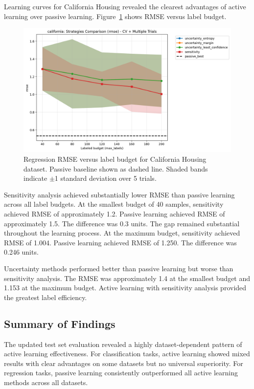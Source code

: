 \documentclass[conference]{IEEEtran}
\begin{document}
Learning curves for California Housing revealed the clearest advantages of active learning over passive learning. Figure~\ref{fig:california-compare} shows RMSE versus label budget.

\begin{figure}[t]
\centering
\includegraphics[width=0.95\columnwidth]{figures/reg_california_comparison_rmse.png}
\caption{Regression RMSE versus label budget for California Housing dataset. Passive baseline shown as dashed line. Shaded bands indicate $\pm$1 standard deviation over 5 trials.}
\label{fig:california-compare}
\end{figure}

Sensitivity analysis achieved substantially lower RMSE than passive learning across all label budgets. At the smallest budget of 40 samples, sensitivity achieved RMSE of approximately 1.2. Passive learning achieved RMSE of approximately 1.5. The difference was 0.3 units. The gap remained substantial throughout the learning process. At the maximum budget, sensitivity achieved RMSE of 1.004. Passive learning achieved RMSE of 1.250. The difference was 0.246 units.

Uncertainty methods performed better than passive learning but worse than sensitivity analysis. The RMSE was approximately 1.4 at the smallest budget and 1.153 at the maximum budget. Active learning with sensitivity analysis provided the greatest label efficiency.

\subsection{Summary of Findings}

The updated test set evaluation revealed a highly dataset-dependent pattern of active learning effectiveness. For classification tasks, active learning showed mixed results with clear advantages on some datasets but no universal superiority. For regression tasks, passive learning consistently outperformed all active learning methods across all datasets.
\end{document}
